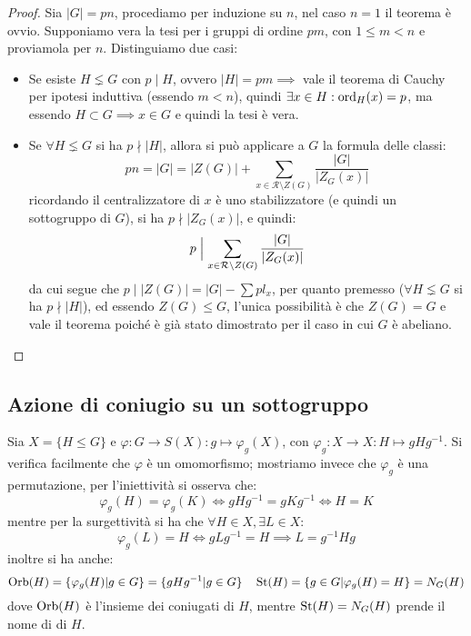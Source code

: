 \documentclass[11pt]{scrartcl}
\begin{document}
\begin{proof}
    Sia $|G| = pn$, procediamo per induzione su $n$, nel caso $n = 1$ il teorema è ovvio. Supponiamo vera la tesi per i gruppi di ordine $pm$, con 
    $1 \leq m < n$ e proviamola per $n$. Distinguiamo due casi:
        \begin{itemize}
            \item Se esiste $H \lneq G$ con $p \mid H$, ovvero $|H| = pm \implies$ vale il teorema di Cauchy per ipotesi induttiva (essendo $m<n$), quindi 
            $\exists x \in H : \operatorname{ord}_H(x) = p$, ma essendo $H \subset G \implies x \in G$ e quindi la tesi è vera.
            \item Se $\forall H \lneq G$ si ha $p \nmid |H|$, allora si può applicare a $G$ la formula delle classi:
                \[ pn = |G| = |Z(G)| + \sum_{x \in \mathcal{R}\setminus{Z(G)}} \frac{|G|}{|Z_G(x)|}
                    \]
                ricordando il centralizzatore di $x$ è uno stabilizzatore (e quindi un sottogruppo di $G$), si ha $p \nmid |Z_G(x)|$, e quindi:
                    \[ p \Bigm| \sum_{x \in \mathcal{R}\setminus{Z(G)}} \frac{|G|}{|Z_G(x)|}
                        \]
                da cui segue che $p \mid |Z(G)| = |G| - \sum pl_x$, per quanto premesso ($\forall H \lneq G$ si ha $p \nmid |H|$), ed essendo $Z(G) \leqslant G$, l'unica 
                possibilità è che $Z(G) = G$ e vale il teorema poiché è già stato dimostrato per il caso in cui $G$ è abeliano.
        \end{itemize}
\end{proof}

\newpage
\subsection{Azione di coniugio su un sottogruppo}
Sia $X = \{H \leqslant G\}$ e $\varphi : G \longrightarrow S(X) : g \longmapsto \varphi_g(X)$, con $\varphi_g : X \longrightarrow X : H \longmapsto gHg^{-1}$. 
    Si verifica facilmente che $\varphi$ è un omomorfismo; mostriamo invece che $\varphi_g$ è una permutazione, per l'iniettività si osserva che:
        \[ \varphi_g(H) = \varphi_g(K) \iff gHg^{-1} = gKg^{-1} \iff H = K
            \]
    mentre per la surgettività si ha che $\forall H \in X, \exists L \in X$:
        \[ \varphi_g(L) = H \iff gLg^{-1} = H \implies L = g^{-1}Hg
            \]
    inoltre si ha anche:
        \[ \operatorname{Orb}(H) = \{\varphi_g(H) | g \in G\} = \{gHg^{-1}| g \in G\} \quad \operatorname{St}(H) = \{g \in G | \varphi_g(H) = H\} = N_G(H)
            \]
    dove $\operatorname{Orb}(H)$ è l'insieme dei coniugati di $H$, mentre $\operatorname{St}(H) = N_G(H)$ prende il nome di  di $H$.
\end{document}
